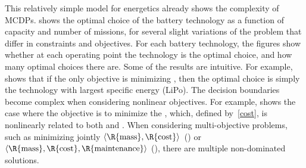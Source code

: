 This relatively simple model for energetics already shows the complexity
of MCDPs.  shows the optimal choice of the battery
technology as a function of capacity and number of missions, for several
slight variations of the problem that differ in constraints and objectives.
For each battery technology, the figures show whether at each operating
point the technology is the optimal choice, and how many optimal choices
there are. Some of the results are intuitive. For example, 
shows that if the only objective is minimizing , then the
optimal choice is simply the technology with largest specific energy
(LiPo). The decision boundaries become complex when considering nonlinear
objectives. For example,  shows the case where the
objective is to minimize the , which, defined by~\eqref{cost},
is nonlinearly related to both  and .
When considering multi-objective problems, such as minimizing jointly
$\left\langle \R{\text{mass}},\R{\text{cost}}\right\rangle $~()
or~$\left\langle \R{\text{mass}},\R{\text{cost}},\R{\text{maintenance}}\right\rangle $
(), there are multiple non-dominated solutions.

